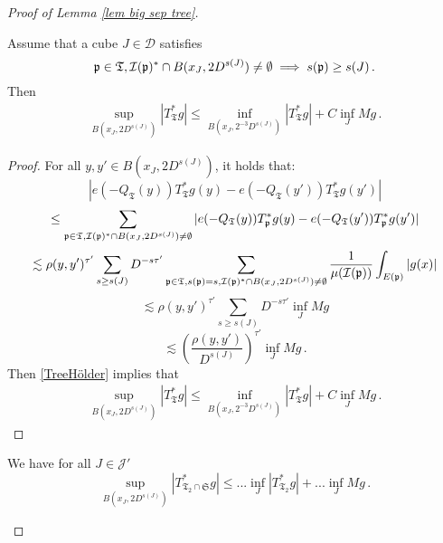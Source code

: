 \begin{proof}[Proof of Lemma \ref{lem big sep tree}]
    \begin{lemma}
        \label{lem sep tree aux 1}
        Assume that a cube $J \in \mathcal{D}$ satisfies
        \begin{equation}
            \label{SepTreesProp}
            \mathfrak p \in \mathfrak{T}, \mathcal{I}(\mathfrak p)^* \cap B(x_J, 2D^{s(J)}) \neq \emptyset \implies s(\mathfrak p) \geq s(J)\,.
        \end{equation}
        Then
        \begin{align}
            \label{TreeUB}
            \sup_{B(x_J, 2D^{s(J)})} |T_{\mathfrak{T}}^*g| \leq \inf_{B(x_J, 2^{-3}D^{s(J)})} |T^*_{\mathfrak{T}} g| + C \inf_{J} Mg\,.
        \end{align}
    \end{lemma}

    \begin{proof}
        For all $y, y' \in B(x_J, 2D^{s(J)})$, it holds that:
        $$
            |e(-Q_{\mathfrak{T}}(y)) T_{\mathfrak{T}}^* g(y) - e(-Q_{\mathfrak{T}}(y')) T_{\mathfrak{T}}^* g(y')|
        $$
        $$
            \leq \sum_{\mathfrak p \in \mathfrak{T}, \mathcal{I}(\mathfrak p)^* \cap B(x_J, 2D^{s(J)}) \neq \emptyset} |e(-Q_{\mathfrak{T}}(y)) T_{\mathfrak p}^* g(y) - e(-Q_{\mathfrak{T}}(y')) T_{\mathfrak p}^*g(y')|
        $$
        $$
            \lesssim \rho(y, y')^{\tau'} \sum_{s \geq s(J)} D^{-s\tau' }\sum_{\mathfrak p \in \mathfrak{T}, s(\mathfrak p) = s, \mathcal{I}(\mathfrak p)^* \cap B(x_J, 2D^{s(J)}) \neq \emptyset}  \frac{1}{\mu(\mathcal{I}(\mathfrak p))}\int_{E(\mathfrak p)} |g(x)|
        $$
        $$
            \lesssim \rho(y, y')^{\tau'} \sum_{s \geq s(J)} D^{-s\tau'}\inf_{J} Mg
        $$
        \begin{equation}
            \lesssim \left(\frac{\rho(y, y')}{D^{s(J)}}\right)^{\tau'}\inf_{J} Mg\,.  \label{TreeHölder}
        \end{equation}
        Then \eqref{TreeHölder} implies that
        \begin{align}
            \label{TreeUB}
            \sup_{B(x_J, 2D^{s(J)})} |T_{\mathfrak{T}}^*g| \leq \inf_{B(x_J, 2^{-3}D^{s(J)})} |T^*_{\mathfrak{T}} g| + C \inf_{J} Mg\,.
        \end{align}
    \end{proof}


    \begin{lemma}
        We have for all $J \in \mathcal{J}'$
        $$
            \sup_{B(x_J, 2 D^{s(J)})} |T^*_{\mathfrak{T}_2 \cap \mathfrak{S}} g| \le ... \inf_{J} |T^*_{\mathfrak{T}_2} g| + ... \inf_{J} Mg\,.
        $$
    \end{lemma}


\end{proof}
